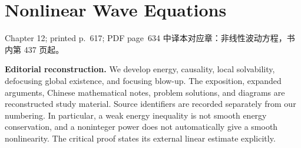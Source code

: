 \chapter{Nonlinear Wave Equations}
\label{chap:nonlinear-wave-equations}

\PDESource
  {Chapter 12; printed p.~617; PDF page~634}
  {中译本对应章：非线性波动方程，书内第 437 页起。}

\noindent\textbf{Editorial reconstruction.}
We develop energy, causality, local solvability, defocusing global
existence, and focusing blow-up. The exposition, expanded arguments,
Chinese mathematical notes, problem solutions, and diagrams are
reconstructed study material. Source identifiers are recorded separately
from our numbering. In particular, a weak energy inequality is not
smooth energy conservation, and a noninteger power does not automatically
give a smooth nonlinearity. The critical proof states its external
linear estimate explicitly.








